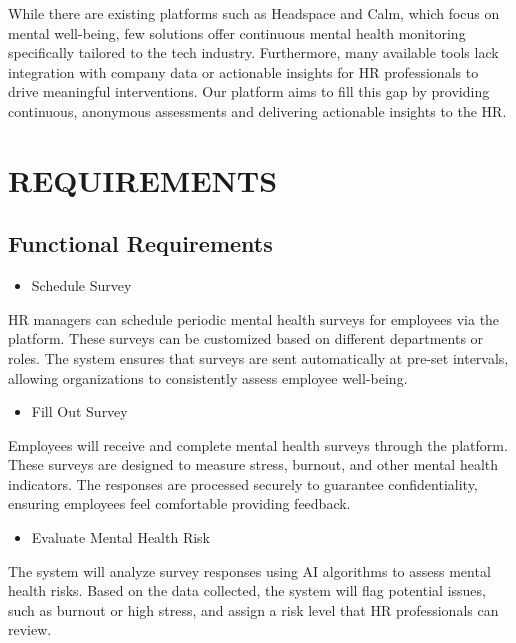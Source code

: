 \documentclass[conference]{IEEEtran}
\begin{document}
While there are existing platforms such as Headspace and
Calm, which focus on mental well-being, few solutions offer
continuous mental health monitoring specifically tailored to
the tech industry. Furthermore, many available tools lack
integration with company data or actionable insights for HR
professionals to drive meaningful interventions. Our platform
aims to fill this gap by providing continuous, anonymous
assessments and delivering actionable insights to the HR.
\newline
\section{REQUIREMENTS}

\subsection{Functional Requirements}

\begin{itemize}
\item Schedule Survey
\end{itemize}

HR managers can schedule periodic mental health surveys
for employees via the platform. These surveys can be
customized based on different departments or roles. The
system ensures that surveys are sent automatically at pre-set
intervals, allowing organizations to consistently assess
employee well-being.
\newline
\begin{itemize}
    \item Fill Out Survey
    \end{itemize}
    
Employees will receive and complete mental health
surveys through the platform. These surveys are designed to
measure stress, burnout, and other mental health indicators.
The responses are processed securely to guarantee
confidentiality, ensuring employees feel comfortable
providing feedback.%
\newline

\par
\begin{itemize}
    \item Evaluate Mental Health Risk
    \end{itemize}
    
    The system will analyze survey responses using AI
    algorithms to assess mental health risks. Based on the data
    collected, the system will flag potential issues, such as burnout
    or high stress, and assign a risk level that HR professionals can
    review.
    \newline
\end{document}
